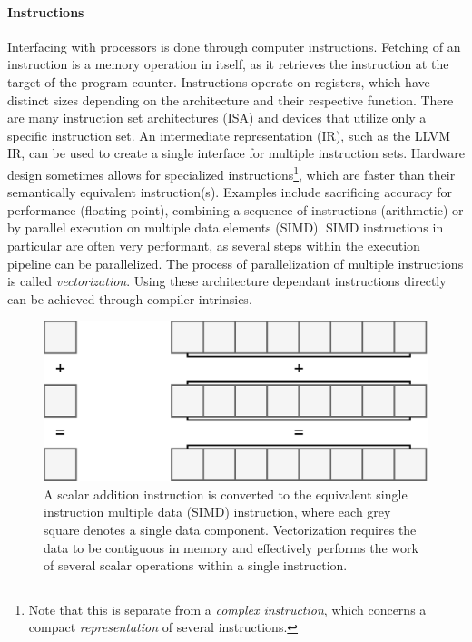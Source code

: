 \documentclass{article}
\begin{document}
\paragraph{Instructions}

Interfacing with processors is done through computer instructions.
Fetching of an instruction is a memory operation in itself, as it retrieves the instruction at the target of the program counter.
Instructions operate on registers, which have distinct sizes depending on the architecture and their respective function.
There are many instruction set architectures (ISA) and devices that utilize only a specific instruction set.
An intermediate representation (IR), such as the LLVM IR\cite{LLVM}, can be used to create a single interface for multiple instruction sets\cite{intermediate-representation}.
Hardware design sometimes allows for specialized instructions\footnote{Note that this is separate from a {\it complex instruction}, which concerns a compact {\it representation} of several instructions. }, which are faster than their semantically equivalent instruction(s).
Examples include sacrificing accuracy for performance (floating-point), combining a sequence of instructions (arithmetic) or by parallel execution on multiple data elements (SIMD).
SIMD instructions in particular are often very performant, as several steps within the execution pipeline can be parallelized.
The process of parallelization of multiple instructions is called {\it vectorization}.
Using these architecture dependant instructions directly can be achieved through compiler intrinsics.

\begin{figure}[ht]
    \centering
    \includegraphics[scale=0.2]{vectorization}
    \caption
    {
        A scalar addition instruction is converted to the equivalent single instruction multiple data (SIMD) instruction, where each grey square denotes a single data component.
        Vectorization requires the data to be contiguous in memory and effectively performs the work of several scalar operations within a single instruction.  
    }
\end{figure}
\end{document}
